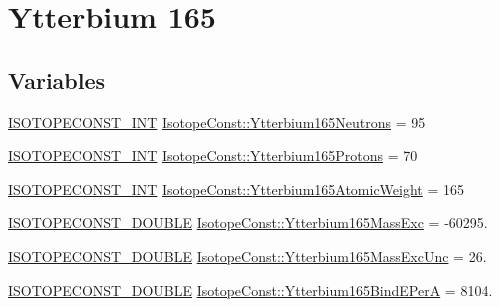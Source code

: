 \hypertarget{group___isotope_const-_ytterbium-_yb165}{}\section{Ytterbium 165}
\label{group___isotope_const-_ytterbium-_yb165}
\subsection*{Variables}
\begin{DoxyCompactItemize}
\item 
\mbox{\hyperlink{group___isotope_const-_macros_ga5f18360b3e99483a35c32d789e62621c}{I\+S\+O\+T\+O\+P\+E\+C\+O\+N\+S\+T\+\_\+\+I\+NT}} \mbox{\hyperlink{group___isotope_const-_ytterbium-_yb165_ga4a4cb62bb42b27efb98840947ae67bf0}{Isotope\+Const\+::\+Ytterbium165\+Neutrons}} = 95
\item 
\mbox{\hyperlink{group___isotope_const-_macros_ga5f18360b3e99483a35c32d789e62621c}{I\+S\+O\+T\+O\+P\+E\+C\+O\+N\+S\+T\+\_\+\+I\+NT}} \mbox{\hyperlink{group___isotope_const-_ytterbium-_yb165_ga05592b7c21d440008d6ff393e2e9ac59}{Isotope\+Const\+::\+Ytterbium165\+Protons}} = 70
\item 
\mbox{\hyperlink{group___isotope_const-_macros_ga5f18360b3e99483a35c32d789e62621c}{I\+S\+O\+T\+O\+P\+E\+C\+O\+N\+S\+T\+\_\+\+I\+NT}} \mbox{\hyperlink{group___isotope_const-_ytterbium-_yb165_ga4bf8e5477d3674ecae80b2c2c65906ec}{Isotope\+Const\+::\+Ytterbium165\+Atomic\+Weight}} = 165
\item 
\mbox{\hyperlink{group___isotope_const-_macros_ga8f45a7272ce02c0b4c65c44636ed719a}{I\+S\+O\+T\+O\+P\+E\+C\+O\+N\+S\+T\+\_\+\+D\+O\+U\+B\+LE}} \mbox{\hyperlink{group___isotope_const-_ytterbium-_yb165_gab659538273f0dd73fc4efc859d0a4b58}{Isotope\+Const\+::\+Ytterbium165\+Mass\+Exc}} = -\/60295.
\item 
\mbox{\hyperlink{group___isotope_const-_macros_ga8f45a7272ce02c0b4c65c44636ed719a}{I\+S\+O\+T\+O\+P\+E\+C\+O\+N\+S\+T\+\_\+\+D\+O\+U\+B\+LE}} \mbox{\hyperlink{group___isotope_const-_ytterbium-_yb165_ga101887d10f48a9453f545ccaef4787e8}{Isotope\+Const\+::\+Ytterbium165\+Mass\+Exc\+Unc}} = 26.
\item 
\mbox{\hyperlink{group___isotope_const-_macros_ga8f45a7272ce02c0b4c65c44636ed719a}{I\+S\+O\+T\+O\+P\+E\+C\+O\+N\+S\+T\+\_\+\+D\+O\+U\+B\+LE}} \mbox{\hyperlink{group___isotope_const-_ytterbium-_yb165_ga3f8323ff0ca9be5c598f7405347f95ad}{Isotope\+Const\+::\+Ytterbium165\+Bind\+E\+PerA}} = 8104.
\item 

\end{DoxyCompactItemize}
